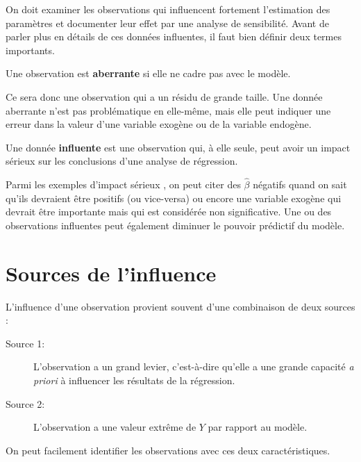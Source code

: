 



\vspace{-0.1in}
On doit examiner les observations qui influencent fortement l'estimation des paramètres et documenter leur effet par une analyse de sensibilité. Avant de parler plus en détails de ces données influentes, il faut bien définir deux termes importants.

\begin{defn}\label{def:aber}
Une observation est \textbf{ aberrante} si elle ne cadre pas avec le modèle.
\end{defn}

\vspace{-0.1in}
Ce sera donc une observation qui a un résidu de grande taille. Une donnée aberrante n'est pas problématique en elle-même, mais elle peut indiquer une erreur dans la valeur d'une variable exogène ou de la variable endogène.

\begin{defn}\label{def:infl}
Une donnée \textbf{influente} est une observation qui, \`a elle seule, peut avoir un impact sérieux sur les conclusions d'une analyse de régression.
\end{defn}

\vspace{-0.1 in}
Parmi les exemples \og d'impact sérieux \fg, on peut citer des $\hat{\beta}$ négatifs quand on sait qu'ils devraient \^etre positifs (ou vice-versa) ou encore une variable exogène qui devrait \^etre importante mais qui est considérée non significative. Une ou des observations influentes peut également diminuer le pouvoir prédictif du modèle.

\section{Sources de l'influence}

L'influence d'une observation provient souvent d'une combinaison de
deux sources :
\begin{description}
\item[Source 1:] L'observation a un grand levier, c'est-à-dire qu'elle a une grande capacité \textit{a priori} à influencer les résultats de la régression.
\item[Source 2:] L'observation a une valeur extrême de $Y$ par rapport au modèle.
\end{description}
On peut facilement identifier les observations avec ces deux caractéristiques.

